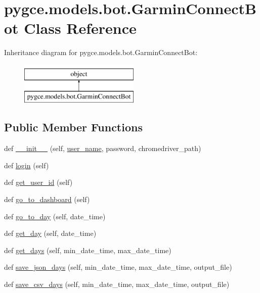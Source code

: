 \hypertarget{classpygce_1_1models_1_1bot_1_1_garmin_connect_bot}{}\section{pygce.\+models.\+bot.\+Garmin\+Connect\+Bot Class Reference}
\label{classpygce_1_1models_1_1bot_1_1_garmin_connect_bot}
Inheritance diagram for pygce.\+models.\+bot.\+Garmin\+Connect\+Bot\+:\begin{figure}[H]
\begin{center}
\leavevmode
\includegraphics[height=2.000000cm]{classpygce_1_1models_1_1bot_1_1_garmin_connect_bot}
\end{center}
\end{figure}
\subsection*{Public Member Functions}
\begin{DoxyCompactItemize}
\item 
def \hyperlink{classpygce_1_1models_1_1bot_1_1_garmin_connect_bot_ac73b806a160c4b34b262baa8aed4d97e}{\+\_\+\+\_\+init\+\_\+\+\_\+} (self, \hyperlink{classpygce_1_1models_1_1bot_1_1_garmin_connect_bot_a259da08c172fe9b54bbb6b997ab840a7}{user\+\_\+name}, password, chromedriver\+\_\+path)
\item 
def \hyperlink{classpygce_1_1models_1_1bot_1_1_garmin_connect_bot_a31c8153cff1e4c2ce2a66d3b3aada3f1}{login} (self)
\item 
def \hyperlink{classpygce_1_1models_1_1bot_1_1_garmin_connect_bot_a395157e0c68fa1e925a2bd0e3fd7034f}{get\+\_\+user\+\_\+id} (self)
\item 
def \hyperlink{classpygce_1_1models_1_1bot_1_1_garmin_connect_bot_ad9433580f9aced25b650ddd5e912cc52}{go\+\_\+to\+\_\+dashboard} (self)
\item 
def \hyperlink{classpygce_1_1models_1_1bot_1_1_garmin_connect_bot_a3a0df451b2e7c0667064adc5c0ba1ad5}{go\+\_\+to\+\_\+day} (self, date\+\_\+time)
\item 
def \hyperlink{classpygce_1_1models_1_1bot_1_1_garmin_connect_bot_ab5ab1e855230273b7c7c085a461a3ed2}{get\+\_\+day} (self, date\+\_\+time)
\item 
def \hyperlink{classpygce_1_1models_1_1bot_1_1_garmin_connect_bot_a18ab2d80266a9da67186bcba6b4856b9}{get\+\_\+days} (self, min\+\_\+date\+\_\+time, max\+\_\+date\+\_\+time)
\item 
def \hyperlink{classpygce_1_1models_1_1bot_1_1_garmin_connect_bot_a6b7760e4013e2ada06bed1a5f47133f1}{save\+\_\+json\+\_\+days} (self, min\+\_\+date\+\_\+time, max\+\_\+date\+\_\+time, output\+\_\+file)
\item 
def \hyperlink{classpygce_1_1models_1_1bot_1_1_garmin_connect_bot_ac10284acc765724afd060381ace0cb5e}{save\+\_\+csv\+\_\+days} (self, min\+\_\+date\+\_\+time, max\+\_\+date\+\_\+time, output\+\_\+file)
\end{DoxyCompactItemize}
